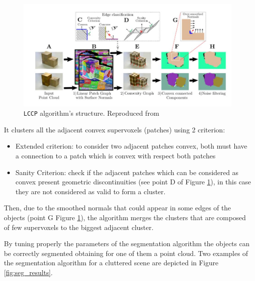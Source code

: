 \begin{figure}[tb]
\centering
\includegraphics[width=\textwidth]{Img/ObjectSegmentation/lccp_structure.jpg}
\caption{\texttt{LCCP} algorithm's structure. Reproduced from \citep{LCCP}}
\label{img:LCCP_structure}
\end{figure}

It clusters all the adjacent convex supervoxels (patches) using 2 criterion:
\begin{itemize}
\item Extended criterion: to consider two adjacent patches convex, both must have a connection to a patch which is convex with respect both patches
\item Sanity Criterion: check if the adjacent patches which can be considered as convex present geometric discontinuities (see point D of Figure \ref{img:LCCP_structure}), in this case they are not considered as valid to form a cluster.
\end{itemize}
Then, due to the smoothed normals that could appear in some edges of the objects (point G Figure \ref{img:LCCP_structure}), the algorithm merges the clusters that are composed of few supervoxels to the biggest adjacent cluster. 

By tuning properly the parameters of the segmentation algorithm the objects can be correctly segmented obtaining for one of them a point cloud. Two examples of the segmentation algorithm for a cluttered scene are depicted in Figure \ref{fig:seg_results}. 

